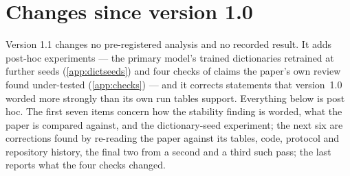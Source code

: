 \section{Changes since version 1.0}
\label{app:changes}

Version 1.1 changes no pre-registered analysis and no recorded result. It
adds post-hoc experiments --- the primary model's trained dictionaries
retrained at further seeds (\cref{app:dictseeds}) and four checks of claims
the paper's own review found under-tested (\cref{app:checks}) --- and it
corrects statements that version~1.0 worded more strongly than its own run
tables support. Everything below is post hoc. The first seven items concern
how the stability finding is worded, what the paper is compared against, and
the dictionary-seed experiment; the next six are corrections found by
re-reading the paper against its tables, code, protocol and repository
history, the final two from a second and a third such pass; the last reports
what the four checks changed.

